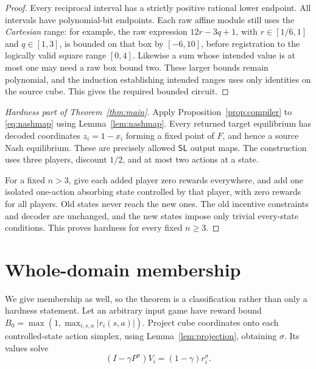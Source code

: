 \documentclass[11pt,a4paper]{article}
\numberwithin{equation}{section}
\theoremstyle{definition}
\newcommand{\SL}{\mathsf{SL}}
\begin{document}
\begin{proof}
Every reciprocal interval has a strictly positive rational lower
endpoint. All intervals have polynomial-bit endpoints. Each raw affine
module still uses the \emph{Cartesian} range: for example, the raw
expression \(12r-3q+1\), with \(r\in[1/6,1]\) and \(q\in[1,3]\),
is bounded on that box by \([-6,10]\), before registration to the
logically valid square range \([0,4]\). Likewise a sum whose intended
value is at most one may need a raw box bound two. These larger bounds
remain polynomial, and the induction establishing intended ranges
uses only identities on the source cube. This gives the required
bounded circuit.
\end{proof}

\begin{proof}[Hardness part of Theorem~\ref{thm:main}]
Apply Proposition~\ref{prop:compiler} to \eqref{eq:nashmap} using
Lemma~\ref{lem:nashmap}. Every returned target equilibrium has decoded
coordinates \(z_i=1-x_i\) forming a fixed point of \(F\), and hence
a source Nash equilibrium. These are precisely allowed \(\SL\)
output maps. The construction uses three players, discount \(1/2\),
and at most two actions at a state.

For a fixed \(n>3\), give each added player zero rewards everywhere,
and add one isolated one-action absorbing state controlled by that
player, with zero rewards for all players. Old states never reach the
new ones. The old incentive constraints and decoder are unchanged,
and the new states impose only trivial every-state conditions. This
proves hardness for every fixed \(n\geq3\).
\end{proof}

\section{Whole-domain membership}\label{sec:upper}

We give membership as well, so the theorem is a classification rather
than only a hardness statement. Let an arbitrary input game have reward
bound \(B_0=\max(1,\max_{i,s,a}|r_i(s,a)|)\).
Project cube coordinates onto each controlled-state action simplex,
using Lemma~\ref{lem:projection}, obtaining \(\sigma\).
Its values solve
\begin{equation}\label{eq:matrix}
 (I-\gamma P^\sigma)V_i=(1-\gamma)r_i^\sigma.
\end{equation}
\end{document}
